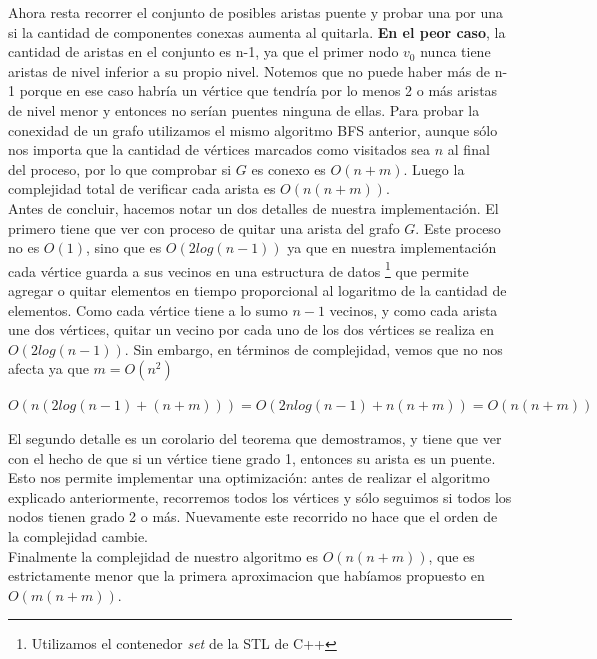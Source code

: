Ahora resta recorrer el conjunto de posibles aristas puente y probar una por una si la cantidad de componentes conexas aumenta al quitarla. \textbf{En el peor caso}, la cantidad de aristas en el 
conjunto es n-1, ya que el primer nodo $v_0$ nunca tiene aristas de nivel inferior a su propio nivel. Notemos que no puede haber más de n-1 porque en ese caso habría un vértice que tendría 
por lo menos 2 o más aristas de nivel menor y entonces no serían puentes ninguna de ellas. Para probar la conexidad de un grafo utilizamos el mismo algoritmo BFS anterior, aunque 
sólo nos importa que la cantidad de vértices marcados como visitados sea $n$ al final del proceso, por lo que comprobar si $G$ es conexo es $O(n+m)$. Luego la complejidad total de verificar 
cada arista es $O(n(n+m))$. \\
Antes de concluir, hacemos notar un dos detalles de nuestra implementación. El primero tiene que ver con proceso de quitar una arista del grafo $G$. Este proceso no es $O(1)$, sino que es 
$O(2 log (n-1))$ ya que en nuestra implementación cada vértice guarda a sus vecinos en una estructura de datos \footnote{Utilizamos el contenedor \textit{set} de la STL de C++} que permite 
agregar o quitar elementos en tiempo proporcional al logaritmo de la cantidad de elementos. Como cada vértice tiene a lo sumo $n-1$ vecinos, y como cada arista une dos vértices, quitar un 
vecino por cada uno de los dos vértices se realiza en $O(2 log(n-1))$. Sin embargo, en términos de complejidad, vemos que no nos afecta ya que $m=O(n^2)$

\begin{center}
 $O(n(2log(n-1) + (n+m))) = O(2nlog(n-1) + n(n+m)) = O(n(n+m))$
\end{center}

El segundo detalle es un corolario del teorema que demostramos, y tiene que ver con el hecho de que si un vértice tiene grado 1, entonces su arista es un puente. Esto nos permite implementar 
una optimización: antes de realizar el algoritmo explicado anteriormente, recorremos todos los vértices y sólo seguimos si todos los nodos tienen grado 2 o más. Nuevamente este recorrido no hace 
que el orden de la complejidad cambie. \\

Finalmente la complejidad de nuestro algoritmo es $O(n(n+m))$, que es estrictamente menor que la primera aproximacion que habíamos propuesto en $O(m(n+m))$.